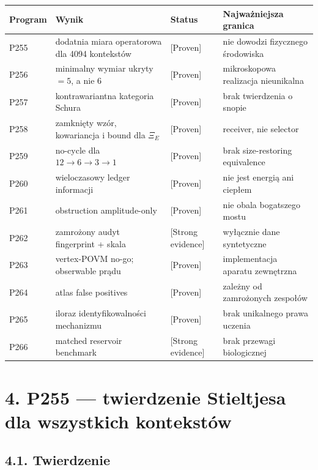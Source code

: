 \documentclass[11pt,a4paper,openany]{report}
\newcommand{\statusProven}{\textcolor{fingreen}{[Proven]}}
\newcommand{\statusStrong}{\textcolor{finblue}{[Strong evidence]}}
\begin{document}
\begin{center}
\begingroup\small
\setlength{\tabcolsep}{2.5pt}
\renewcommand{\arraystretch}{1.16}
\begin{longtable}{@{}p{}p{}p{}p{}@{}}
\toprule
\textbf{Program} & \textbf{Wynik} & \textbf{Status} & \textbf{Najwa\.zniejsza granica} \\
\midrule
\endhead
P255 & dodatnia miara operatorowa dla 4094 kontekstów & \statusProven{} & nie dowodzi fizycznego środowiska \\
P256 & minimalny wymiar ukryty \(=5\), a nie 6 & \statusProven{} & mikroskopowa realizacja nieunikalna \\
P257 & kontrawariantna kategoria Schura & \statusProven{} & brak twierdzenia o snopie \\
P258 & zamknięty wzór, kowariancja i bound dla \(\Xi_E\) & \statusProven{} & receiver, nie selector \\
P259 & no-cycle dla \(12\to6\to3\to1\) & \statusProven{} & brak size-restoring equivalence \\
P260 & wieloczasowy ledger informacji & \statusProven{} & nie jest energią ani ciepłem \\
P261 & obstruction amplitude-only & \statusProven{} & nie obala bogatszego mostu \\
P262 & zamro\.zony audyt fingerprint + skala & \statusStrong{} & wyłącznie dane syntetyczne \\
P263 & vertex-POVM no-go; obserwable prądu & \statusProven{} & implementacja aparatu zewnętrzna \\
P264 & atlas false positives & \statusProven{} & zale\.zny od zamro\.zonych zespołów \\
P265 & iloraz identyfikowalności mechanizmu & \statusProven{} & brak unikalnego prawa uczenia \\
P266 & matched reservoir benchmark & \statusStrong{} & brak przewagi biologicznej \\
\bottomrule
\end{longtable}
\endgroup
\end{center}

\chapter{4. P255 --- twierdzenie Stieltjesa dla wszystkich kontekstów}

\section{4.1. Twierdzenie}
\end{document}
